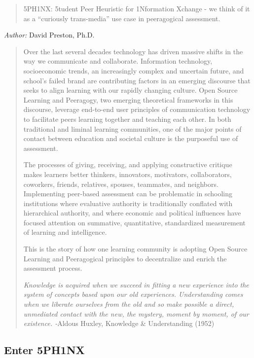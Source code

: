 \begin{quote}
5PH1NX: 5tudent Peer Heuristic for 1Nformation Xchange - we think of it
as a ``curiously trans-media'' use case in peeragogical assessment.
\end{quote}
\emph{Author:} David Preston, Ph.D.

\begin{quote}
Over the last several decades technology has driven massive shifts in
the way we communicate and collaborate. Information technology,
socioeconomic trends, an increasingly complex and uncertain future, and
school's failed brand are contributing factors in an emerging discourse
that seeks to align learning with our rapidly changing culture. Open
Source Learning and Peeragogy, two emerging theoretical frameworks in
this discourse, leverage end-to-end user principles of communication
technology to facilitate peers learning together and teaching each
other. In both traditional and liminal learning communities, one of the
major points of contact between education and societal culture is the
purposeful use of assessment.

The processes of giving, receiving, and applying constructive critique
makes learners better thinkers, innovators, motivators, collaborators,
coworkers, friends, relatives, spouses, teammates, and neighbors.
Implementing peer-based assessment can be problematic in schooling
institutions where evaluative authority is traditionally conflated with
hierarchical authority, and where economic and political influences have
focused attention on summative, quantitative, standardized measurement
of learning and intelligence.

This is the story of how one learning community is adopting Open Source
Learning and Peeragogical principles to decentralize and enrich the
assessment process.

\emph{Knowledge is acquired when we succeed in fitting a new experience
into the system of concepts based upon our old experiences.
Understanding comes when we liberate ourselves from the old and so make
possible a direct, unmediated contact with the new, the mystery, moment
by moment, of our existence. -}Aldous Huxley, Knowledge \& Understanding
(1952)

\end{quote}
\subsection{Enter 5PH1NX}

